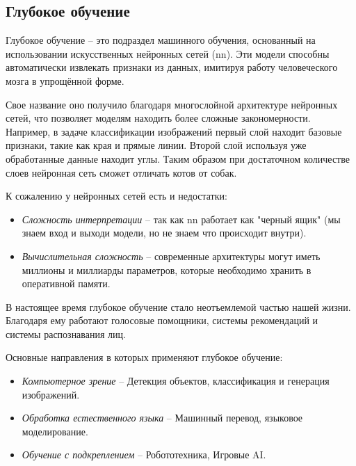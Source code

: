 \documentclass[../part_1.tex]{subfiles}
\begin{document}
\subsection{Глубокое обучение}
\par Глубокое обучение -- это подраздел машинного обучения, основанный на использовании искусственных нейронных сетей (\acrshort{nn}). Эти модели способны автоматически извлекать признаки из данных, имитируя работу человеческого мозга в упрощённой форме.
\par Свое название оно получило благодаря многослойной архитектуре нейронных сетей, что позволяет моделям находить более сложные закономерности. Например, в задаче классификации изображений первый слой находит базовые признаки, такие как края и прямые линии. Второй слой используя уже обработанные данные находит углы. Таким образом при достаточном количестве слоев нейронная сеть сможет отличать котов от собак. 
\par К сожалению у нейронных сетей есть и недостатки:
\begin{itemize}
    \item \textit{Сложность интерпретации} -- так как \acrshort{nn} работает как "черный ящик" (мы знаем вход и выходи модели, но не знаем что происходит внутри).
    \item \textit{Вычислительная сложность} -- современные архитектуры могут иметь миллионы и миллиарды параметров, которые необходимо хранить в оперативной памяти.
\end{itemize}
\par В настоящее время глубокое обучение стало неотъемлемой частью нашей жизни. Благодаря ему работают голосовые помощники, системы рекомендаций и системы распознавания лиц.
\par Основные направления в которых применяют глубокое обучение:
\begin{itemize}
    \item \textit{Компьютерное зрение} -- Детекция объектов, классификация и генерация изображений.
    \item \textit{Обработка естественного языка} -- Машинный перевод, языковое моделирование.
    \item \textit{Обучение с подкреплением} -- Робототехника, Игровые AI.
\end{itemize}
\end{document}
